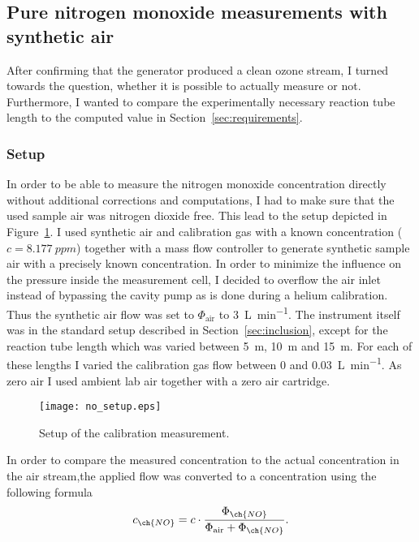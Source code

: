\subsection{Pure nitrogen monoxide measurements with synthetic air}
\label{sec:no}

After confirming that the generator produced a clean ozone stream, I
turned towards the question, whether it is possible to actually
measure  or not. Furthermore, I wanted to compare the
experimentally necessary reaction tube length to the computed value in
Section~\ref{sec:requirements}.

\subsubsection{Setup}
\label{sec:no-setup}

In order to be able to measure the nitrogen monoxide concentration
directly without additional corrections and computations, I had to
make sure that the used sample air was nitrogen dioxide free. This
lead to the setup depicted in Figure~\ref{fig:no-setup}. I used
synthetic air and  calibration gas with a known 
concentration ($c = \SI{8.177}{ppm}$) together with a mass flow
controller to generate synthetic sample air with a precisely known
 concentration. In order to minimize the influence on the
pressure inside the measurement cell, I decided to overflow the air
inlet instead of bypassing the cavity pump as is done during a helium
calibration. Thus the synthetic air flow was set to
$\Phi_{\text{air}}$ to \SI{3}{\liter\per\minute}. The instrument
itself was in the standard setup described in
Section~\ref{sec:inclusion}, except for the reaction tube length which
was varied between \SI{5}{\meter}, \SI{10}{\meter} and
\SI{15}{\meter}. For each of these lengths I varied the 
calibration gas flow between \num{0} and
\SI{0.03}{\liter\per\minute}. As zero air I used ambient lab air
together with a zero air cartridge.

\begin{figure}[htbp]
  \centering
  \texttt{[image: no\_setup.eps]}
  \caption{Setup of the calibration measurement.}
  \label{fig:no-setup}
\end{figure}

In order to compare the measured  concentration to the actual
concentration in the air stream,the applied  flow was converted
to a concentration using the following formula
\begin{align}
  c_{\ch{NO}} = c \cdot \frac{\Phi_{\ch{NO}}}{\Phi_{\text{air}} +
  \Phi_{\ch{NO}}}. \label{eq:c-flow}
\end{align}

